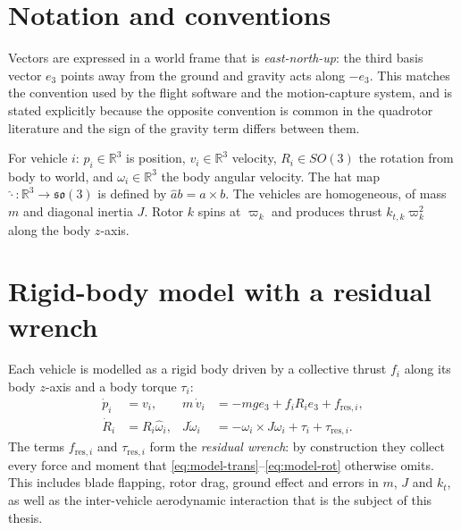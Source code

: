 \section{Notation and conventions}
\label{sec:model-notation}

Vectors are expressed in a world frame that is \emph{east-north-up}: the third basis vector $e_3$
points away from the ground and gravity acts along $-e_3$. This matches the convention used by the
flight software and the motion-capture system, and is stated explicitly because the opposite
convention is common in the quadrotor literature and the sign of the gravity term differs between
them.

For vehicle $i$: $p_i \in \mathbb{R}^3$ is position, $v_i \in \mathbb{R}^3$ velocity,
$R_i \in SO(3)$ the rotation from body to world, and $\omega_i \in \mathbb{R}^3$ the body angular
velocity. The hat map $\hat{\cdot} : \mathbb{R}^3 \to \mathfrak{so}(3)$ is defined by
$\hat{a}b = a \times b$. The vehicles are homogeneous, of mass $m$ and diagonal inertia $J$.
Rotor $k$ spins at $\varpi_k$ and produces thrust $k_{t,k}\varpi_k^2$ along the body $z$-axis.

\section{Rigid-body model with a residual wrench}
\label{sec:model-dynamics}

Each vehicle is modelled as a rigid body driven by a collective thrust $f_i$ along its body
$z$-axis and a body torque $\tau_i$:
%
\begin{align}
  \dot{p}_i &= v_i, &
  m\,\dot{v}_i &= -m g e_3 + f_i R_i e_3 + f_{\mathrm{res},i}, \label{eq:model-trans}\\
  \dot{R}_i &= R_i \hat{\omega}_i, &
  J\dot{\omega}_i &= -\omega_i \times J\omega_i + \tau_i + \tau_{\mathrm{res},i}.
  \label{eq:model-rot}
\end{align}
%
The terms $f_{\mathrm{res},i}$ and $\tau_{\mathrm{res},i}$ form the \emph{residual wrench}: by
construction they collect every force and moment that \eqref{eq:model-trans}--\eqref{eq:model-rot}
otherwise omits. This includes blade flapping, rotor drag, ground effect and errors in $m$, $J$ and
$k_t$, as well as the inter-vehicle aerodynamic interaction that is the subject of this thesis.

